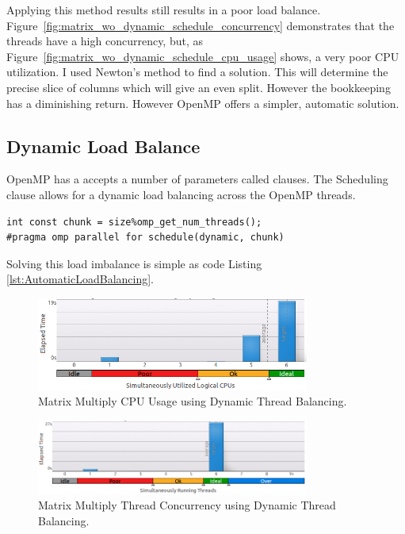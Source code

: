 \documentclass[journal,10pt,onecolumn]{IEEEtran}
\begin{document}
Applying this method results still results in a poor load balance.  
Figure~\ref{fig:matrix_wo_dynamic_schedule_concurrency} demonstrates that the threads have a high 
concurrency, but, as Figure~\ref{fig:matrix_wo_dynamic_schedule_cpu_usage} shows, a very poor CPU 
utilization. I used Newton's method to find a solution. This will determine the precise slice of
 columns which will give an even split. However the bookkeeping has a diminishing 
return.  However OpenMP offers a simpler, automatic solution.

\subsection{Dynamic Load Balance}
OpenMP has a accepts a number of parameters called clauses. The Scheduling clause allows
for a dynamic load balancing across the OpenMP threads. 

\begin{lstlisting}
int const chunk = size%omp_get_num_threads();
#pragma omp parallel for schedule(dynamic, chunk)
\end{lstlisting}
\label{lst:AutomaticLoadBalancing}
Solving this load imbalance is simple as code Listing \ref{lst:AutomaticLoadBalancing}.

\begin{figure}[!t]
\begin{center}
\includegraphics[width=0.8\textwidth]{figures/matrix_dynamic_schedule_cpu_usage.png}
\caption{Matrix Multiply CPU Usage using Dynamic Thread Balancing.}
\label{fig:matrix_dynamic_schedule_cpu_usage}
\end{center}
\end{figure}

\begin{figure}[!t]
\begin{center}
\includegraphics[width=0.8\textwidth]{figures/matrix_dynamic_schedule_thread_concurrency.png}
\caption{Matrix Multiply Thread Concurrency using Dynamic Thread Balancing.}
\label{fig:matrix_dynamic_schedule_concurrency}
\end{center}
\end{figure}
\end{document}
